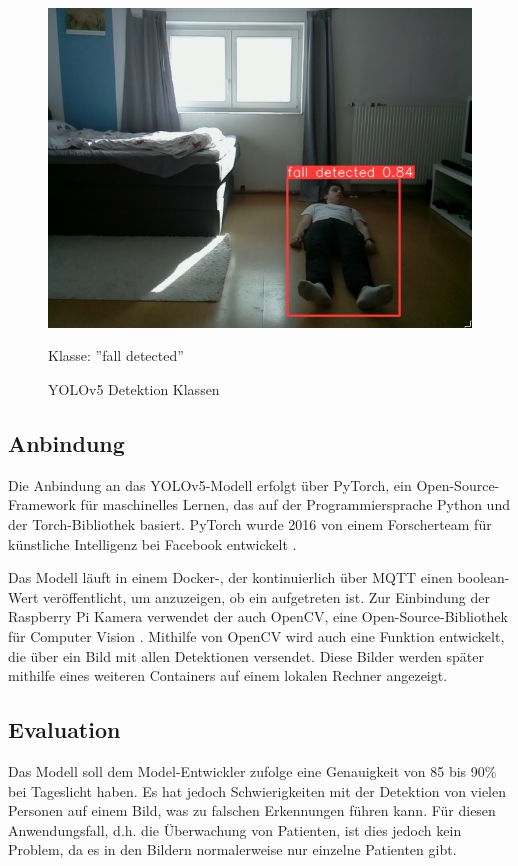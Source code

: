 \begin{figure}[H]
\begin{minipage}[b]{0.3\textwidth}
		\includegraphics[width=\textwidth]{images/fallen.png}
		\caption*{Klasse: ''fall detected''}
	\end{minipage}
	\caption{YOLOv5 Detektion Klassen}
	\label{fig:yolo_classes}
\end{figure}



\subsection{Anbindung}
Die Anbindung an das YOLOv5-Modell erfolgt über PyTorch, ein Open-Source-Framework für maschinelles Lernen, das auf der Programmiersprache Python und der Torch-Bibliothek basiert. PyTorch wurde 2016 von einem Forscherteam für künstliche Intelligenz bei Facebook entwickelt \cite{noauthor_pytorch_nodate}.

Das Modell läuft in einem Docker-, der kontinuierlich über MQTT einen boolean-Wert veröffentlicht, um anzuzeigen, ob ein  aufgetreten ist. Zur Einbindung der Raspberry Pi Kamera verwendet der  auch OpenCV, eine Open-Source-Bibliothek für Computer Vision \cite{OpenCV}. Mithilfe von OpenCV wird auch eine Funktion entwickelt, die über  ein Bild mit allen Detektionen versendet. Diese Bilder werden später mithilfe eines weiteren  Containers auf einem lokalen Rechner angezeigt.

\subsection{Evaluation}
Das Modell soll dem Model-Entwickler zufolge eine Genauigkeit von 85 bis 90\% bei Tageslicht haben. Es hat jedoch Schwierigkeiten mit der Detektion von vielen Personen auf einem Bild, was zu falschen Erkennungen führen kann. Für diesen Anwendungsfall, d.h. die Überwachung von Patienten, ist dies jedoch kein Problem, da es in den Bildern normalerweise nur einzelne Patienten gibt. 

